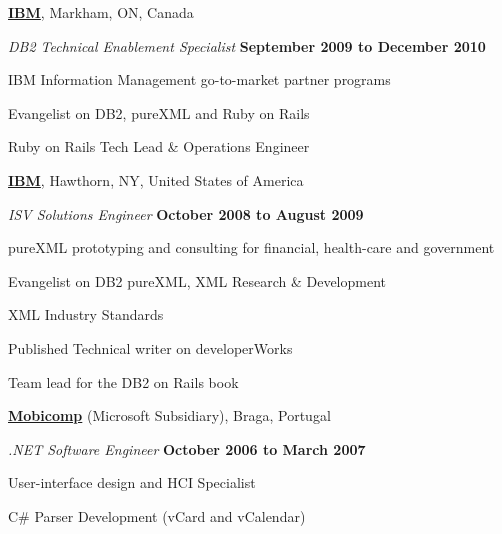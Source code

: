 \documentclass[10pt]{article}
\newenvironment{outerlist}[1][\enskip\textbullet]%
        {\begin{enumerate}[#1]}{\end{enumerate}%
         \vspace{-.6\baselineskip}}
\newenvironment{innerlist}[1][\enskip\textbullet]%
        {\begin{compactenum}[#1]}{\end{compactenum}}
\newcommand{\blankline}{\quad\pagebreak[2]}
\begin{document}
\blankline

\href{http://www.ibm.com/}{\textbf{IBM}}, 
Markham, ON, Canada
\begin{outerlist}

  \item[] \textit{DB2 Technical Enablement Specialist}%
          \hfill \textbf{September 2009 to December 2010}
  \begin{innerlist}
\item IBM Information Management go-to-market partner programs
\item Evangelist on DB2, pureXML and Ruby on Rails
\item Ruby on Rails Tech Lead \& Operations Engineer
  \end{innerlist}

\end{outerlist}

\blankline

\href{http://www.ibm.com/}{\textbf{IBM}}, 
Hawthorn, NY, United States of America
\begin{outerlist}

  \item[] \textit{ISV Solutions Engineer}%
          \hfill \textbf{October 2008 to August 2009}
  \begin{innerlist}
\item pureXML prototyping and consulting for financial, health-care and government
\item Evangelist on DB2 pureXML, XML Research \& Development
\item XML Industry Standards
\item Published Technical writer on developerWorks
\item Team lead for the DB2 on Rails book
  \end{innerlist}

\end{outerlist}


%
%

\blankline

\href{http://www.mobicomp.com/}{\textbf{Mobicomp}} (Microsoft Subsidiary), 
Braga, Portugal
\begin{outerlist}

\item[] \textit{.NET Software Engineer}%
        \hfill \textbf{October 2006 to March 2007}
\begin{innerlist}
\item User-interface design and HCI Specialist
\item C\# Parser Development (vCard and vCalendar)
\end{innerlist}

\end{outerlist}
\end{document}
